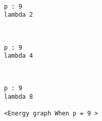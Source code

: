 \documentclass[11pt]{article}
\begin{document}
    \begin{center}
    \end{center}
    { \hspace*{\fill} \\}
    
    \begin{Verbatim}[commandchars=\\\{\}]
p : 9
lambda 2

    \end{Verbatim}

    \begin{center}
    \end{center}
    { \hspace*{\fill} \\}
    
    \begin{Verbatim}[commandchars=\\\{\}]
p : 9
lambda 4

    \end{Verbatim}

    \begin{center}
    \end{center}
    { \hspace*{\fill} \\}
    
    \begin{Verbatim}[commandchars=\\\{\}]
p : 9
lambda 8

<Energy graph When p = 9 >

    \end{Verbatim}

    \begin{center}
    \end{center}
    { \hspace*{\fill} \\}
    
    \begin{center}
    \end{center}
    { \hspace*{\fill} \\}
    
\end{document}
